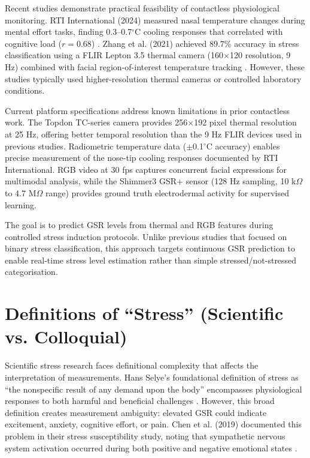 Recent studies demonstrate practical feasibility of contactless physiological monitoring. RTI International (2024) measured nasal temperature changes during mental effort tasks, finding 0.3--0.7$^\circ$C cooling responses that correlated with cognitive load ($r = 0.68$) \cite{ref6}. Zhang et al. (2021) achieved 89.7\% accuracy in stress classification using a FLIR Lepton 3.5 thermal camera (160$\times$120 resolution, 9 Hz) combined with facial region-of-interest temperature tracking \cite{ref5}. However, these studies typically used higher-resolution thermal cameras or controlled laboratory conditions.

Current platform specifications address known limitations in prior contactless work. The Topdon TC-series camera provides 256$\times$192 pixel thermal resolution at 25 Hz, offering better temporal resolution than the 9 Hz FLIR devices used in previous studies. Radiometric temperature data ($\pm$0.1$^\circ$C accuracy) enables precise measurement of the nose-tip cooling responses documented by RTI International. RGB video at 30 fps captures concurrent facial expressions for multimodal analysis, while the Shimmer3 GSR+ sensor (128 Hz sampling, 10 k$\Omega$ to 4.7 M$\Omega$ range) provides ground truth electrodermal activity for supervised learning.

The goal is to predict GSR levels from thermal and RGB features during controlled stress induction protocols. Unlike previous studies that focused on binary stress classification, this approach targets continuous GSR prediction to enable real-time stress level estimation rather than simple stressed/not-stressed categorisation.

\section{Definitions of ``Stress'' (Scientific vs. Colloquial)}
Scientific stress research faces definitional complexity that affects the interpretation of measurements. Hans Selye's foundational definition of stress as ``the nonspecific result of any demand upon the body'' encompasses physiological responses to both harmful and beneficial challenges \cite{ref11}. However, this broad definition creates measurement ambiguity: elevated GSR could indicate excitement, anxiety, cognitive effort, or pain. Chen et al. (2019) documented this problem in their stress susceptibility study, noting that sympathetic nervous system activation occurred during both positive and negative emotional states \cite{ref4}.

